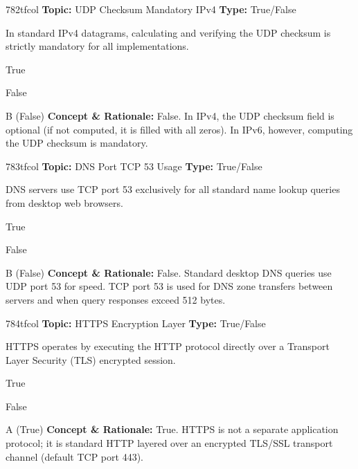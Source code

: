 \begin{qcard}{782}{tfcol}
\textcolor{darkslate!75}{\small\textbf{Topic:} UDP Checksum Mandatory IPv4 \hfill \textbf{Type:} True/False}\vspace{0.4em}\par
In standard IPv4 datagrams, calculating and verifying the UDP checksum is strictly mandatory for all implementations.
\begin{qoptions}
\item True
\item False
\end{qoptions}
\end{qcard}
\nopagebreak
\begin{explainbox}{B (False)}
\textbf{Concept \& Rationale:} False. In IPv4, the UDP checksum field is optional (if not computed, it is filled with all zeros). In IPv6, however, computing the UDP checksum is mandatory.
\end{explainbox}

\begin{qcard}{783}{tfcol}
\textcolor{darkslate!75}{\small\textbf{Topic:} DNS Port TCP 53 Usage \hfill \textbf{Type:} True/False}\vspace{0.4em}\par
DNS servers use TCP port 53 exclusively for all standard name lookup queries from desktop web browsers.
\begin{qoptions}
\item True
\item False
\end{qoptions}
\end{qcard}
\nopagebreak
\begin{explainbox}{B (False)}
\textbf{Concept \& Rationale:} False. Standard desktop DNS queries use UDP port 53 for speed. TCP port 53 is used for DNS zone transfers between servers and when query responses exceed 512 bytes.
\end{explainbox}

\begin{qcard}{784}{tfcol}
\textcolor{darkslate!75}{\small\textbf{Topic:} HTTPS Encryption Layer \hfill \textbf{Type:} True/False}\vspace{0.4em}\par
HTTPS operates by executing the HTTP protocol directly over a Transport Layer Security (TLS) encrypted session.
\begin{qoptions}
\item True
\item False
\end{qoptions}
\end{qcard}
\nopagebreak
\begin{explainbox}{A (True)}
\textbf{Concept \& Rationale:} True. HTTPS is not a separate application protocol; it is standard HTTP layered over an encrypted TLS/SSL transport channel (default TCP port 443).
\end{explainbox}

